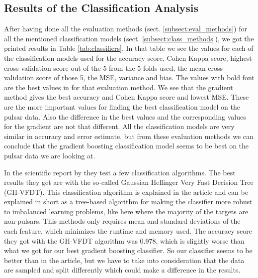 \documentclass[12pt,a4paper,english]{article}
\begin{document}
\subsection{Results of the Classification Analysis}
\label{subsect:Res_class}
After having done all the evaluation methods (sect. \ref{subsect:eval_methods}) for all the mentioned classification models (sect. \ref{subsect:class_methods}), we got the printed results in Table \ref{tab:classifiers}. In that table we see the values for each of the classification models used for the accuracy score, Cohen Kappa score, highest cross-validation score out of the 5 from the 5 folds used, the mean cross-validation score of those 5, the MSE, variance and bias. The values with bold font are the best values in for that evaluation method. We see that the gradient method gives the best accuracy and Cohen Kappa score and lowest MSE. These are the more important values for finding the best classification model on the pulsar data. Also the difference in the best values and the corresponding values for the gradient are not that different. All the classification models are very similar in accuracy and error estimate, but from these evaluation methods we can conclude that the gradient boosting classification model seems to be best on the pulsar data we are looking at. 

In the scientific report by \citet{pulsar_art} they test a few classification algorithms. The best results they get are with the so-called Gaussian Hellinger Very Fast Decision Tree (GH-VFDT). This classification algorithm is explained in the article and can be explained in short as a tree-based algorithm for making the classifier more robust to imbalanced learning problems, like here where the majority of the targets are non-pulsars. This methods only requires mean and standard deviations of the each feature, which minimizes the runtime and memory used. The accuracy score they got with the GH-VFDT algorithm was 0.978, which is slightly worse than what we got for our best gradient boosting classifier. So our classifier seems to be better than in the article, but we have to take into consideration that the data are sampled and split differently which could make a difference in the results. 
\end{document}
